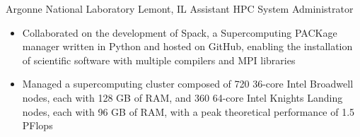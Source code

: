 
        {Argonne National Laboratory}
        {Lemont, IL}
        {Assistant HPC System Administrator}
        {}{
    \begin{itemize}
        \item Collaborated on the development of Spack, a Supercomputing PACKage manager written
            in Python and hosted on GitHub, enabling the installation of scientific software with
            multiple compilers and MPI libraries
        \item Managed a supercomputing cluster composed of 720 36-core Intel Broadwell nodes,
            each with 128 GB of RAM, and 360 64-core Intel Knights Landing nodes, each with
            96 GB of RAM, with a peak theoretical performance of 1.5 PFlops
    \end{itemize}
}
